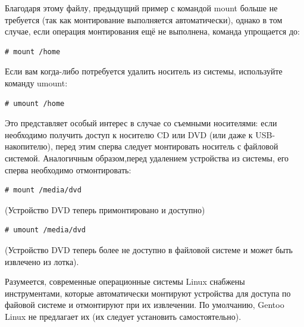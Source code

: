 \documentclass[10pt]{book}
\begin{document}
Благодаря этому файлу, предыдущий пример с командой mount больше не требуется (так как монтирование выполняется автоматически), однако в том случае, если операция монтирования ещё не выполнена, команда упрощается до:

\vspace{3mm}
\begin{tcolorbox}
\begin{lstlisting}
# mount /home
\end{lstlisting}
\end{tcolorbox}

Если вам когда-либо потребуется удалить носитель из системы, используйте команду umount:

\vspace{3mm}
\begin{tcolorbox}
\begin{lstlisting}
# umount /home
\end{lstlisting}
\end{tcolorbox}

Это представляет особый интерес в случае со съемными носителями: если  необходимо получить доступ к носителю CD или DVD (или даже к USB-накопителю), перед этим сперва следует монтировать носитель с файловой системой. Аналогичным образом,перед удалением устройства из системы, его сперва необходимо отмонтировать:

\vspace{3mm}
\begin{tcolorbox}
\begin{lstlisting}
# mount /media/dvd
\end{lstlisting}
\end{tcolorbox}

(Устройство DVD теперь примонтировано и доступно)

\vspace{3mm}
\begin{tcolorbox}
\begin{lstlisting}
# umount /media/dvd
\end{lstlisting}
\end{tcolorbox}

(Устройство DVD теперь более не доступно в файловой системе и может быть извлечено из лотка).

Разумеется, современные операционные системы Linux снабжены инструментами, которые автоматически монтируют устройства для доступа по файовой системе и отмонтируют при их извлечении. По умолчанию, Gentoo Linux не предлагает их (их следует установить самостоятельно).
\end{document}
